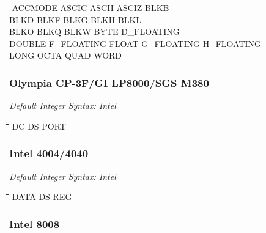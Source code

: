 {\tt\begin{tabbing}
\hspace{3cm}\=\hspace{3cm}\=\hspace{3cm}\=\hspace{3cm}\=\kill
ACCMODE     \> ASCIC       \> ASCII       \> ASCIZ        \> BLKB \\
BLKD        \> BLKF        \> BLKG        \> BLKH         \> BLKL \\
BLKO        \> BLKQ        \> BLKW        \> BYTE         \> D\_FLOATING \\
DOUBLE      \> F\_FLOATING \> FLOAT       \> G\_FLOATING  \> H\_FLOATING \\
LONG        \> OCTA        \> QUAD        \> WORD \\
\end{tabbing}}

\subsubsection{Olympia CP-3F/GI LP8000/SGS M380}

{\em Default Integer Syntax: Intel}

{\tt\begin{tabbing}
\hspace{3cm}\=\hspace{3cm}\=\hspace{3cm}\=\hspace{3cm}\=\kill   
DC         \> DS          \> PORT \\
\end{tabbing}}

\subsubsection{Intel 4004/4040}

{\em Default Integer Syntax: Intel}

{\tt\begin{tabbing}
\hspace{3cm}\=\hspace{3cm}\=\hspace{3cm}\=\hspace{3cm}\=\kill   
DATA       \> DS          \> REG \\
\end{tabbing}}

\subsubsection{Intel 8008}

